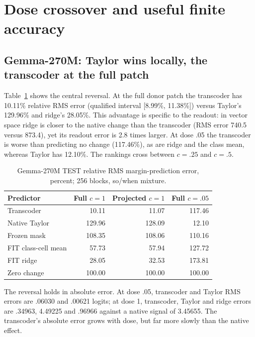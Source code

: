 \documentclass[11pt]{article}
\begin{document}
\section{Dose crossover and useful finite accuracy}
\subsection{Gemma-270M: Taylor wins locally, the transcoder at the full patch}
Table~\ref{tab:main} shows the central reversal. At the full donor patch the transcoder has 10.11\% relative RMS error (qualified interval [8.99\%, 11.38\%]) versus Taylor's 129.96\% and ridge's 28.05\%. This advantage is specific to the readout: in vector space ridge is closer to the native change than the transcoder (RMS error 740.5 versus 873.4), yet its readout error is 2.8 times larger. At dose .05 the transcoder is worse than predicting no change (117.46\%), as are ridge and the class mean, whereas Taylor has 12.10\%. The rankings cross between $c=.25$ and $c=.5$.

\begin{table}[ht]\centering\small
\begin{tabular}{lrrr}\toprule Predictor & Full $c=1$ & Projected $c=1$ & Full $c=.05$\\\midrule
Transcoder & 10.11 & 11.07 & 117.46\\
Native Taylor & 129.96 & 128.09 & 12.10\\
Frozen mask & 108.35 & 108.06 & 110.16\\
FIT class-cell mean & 57.73 & 57.94 & 127.72\\
FIT ridge & 28.05 & 32.53 & 173.81\\
Zero change & 100.00 & 100.00 & 100.00\\\bottomrule\end{tabular}
\caption{Gemma-270M TEST relative RMS margin-prediction error, percent; 256 blocks, so/when mixture.}\label{tab:main}
\end{table}

The reversal holds in absolute error. At dose .05, transcoder and Taylor RMS errors are .06030 and .00621 logits; at dose 1, transcoder, Taylor and ridge errors are .34963, 4.49225 and .96966 against a native signal of 3.45655. The transcoder's absolute error grows with dose, but far more slowly than the native effect.
\end{document}
